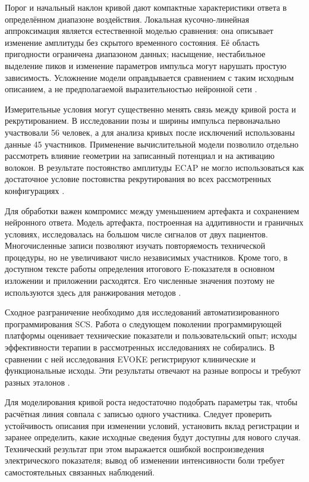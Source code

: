 Порог и начальный наклон кривой дают компактные характеристики ответа в определённом диапазоне воздействия. Локальная кусочно-линейная аппроксимация является естественной моделью сравнения: она описывает изменение амплитуды без скрытого временного состояния. Её область пригодности ограничена диапазоном данных; насыщение, нестабильное выделение пиков и изменение параметров импульса могут нарушать простую зависимость. Усложнение модели оправдывается сравнением с таким исходным описанием, а не предполагаемой выразительностью нейронной сети \cite{s159,posture}.

Измерительные условия могут существенно менять связь между кривой роста и рекрутированием. В исследовании позы и ширины импульса первоначально участвовали 56 человек, а для анализа кривых после исключений использованы данные 45 участников. Применение вычислительной модели позволило отдельно рассмотреть влияние геометрии на записанный потенциал и на активацию волокон. В результате постоянство амплитуды ECAP не могло использоваться как достаточное условие постоянства рекрутирования во всех рассмотренных конфигурациях \cite{posture}.

Для обработки важен компромисс между уменьшением артефакта и сохранением нейронного ответа. Модель артефакта, построенная на аддитивности и граничных условиях, исследовалась на большом числе сигналов от двух пациентов. Многочисленные записи позволяют изучать повторяемость технической процедуры, но не увеличивают число независимых участников. Кроме того, в доступном тексте работы определения итогового E-показателя в основном изложении и приложении расходятся. Его численные значения поэтому не используются здесь для ранжирования методов \cite{s159}.

Сходное разграничение необходимо для исследований автоматизированного программирования SCS. Работа о следующем поколении программирующей платформы оценивает технические показатели и пользовательский опыт; исходы эффективности терапии в рассмотренных исследованиях не собирались. В сравнении с ней исследования EVOKE регистрируют клинические и функциональные исходы. Эти результаты отвечают на разные вопросы и требуют разных эталонов \cite{s162,s780,s781}.

Для моделирования кривой роста недостаточно подобрать параметры так, чтобы расчётная линия совпала с записью одного участника. Следует проверить устойчивость описания при изменении условий, установить вклад регистрации и заранее определить, какие исходные сведения будут доступны для нового случая. Технический результат при этом выражается ошибкой воспроизведения электрического показателя; вывод об изменении интенсивности боли требует самостоятельных связанных наблюдений.

